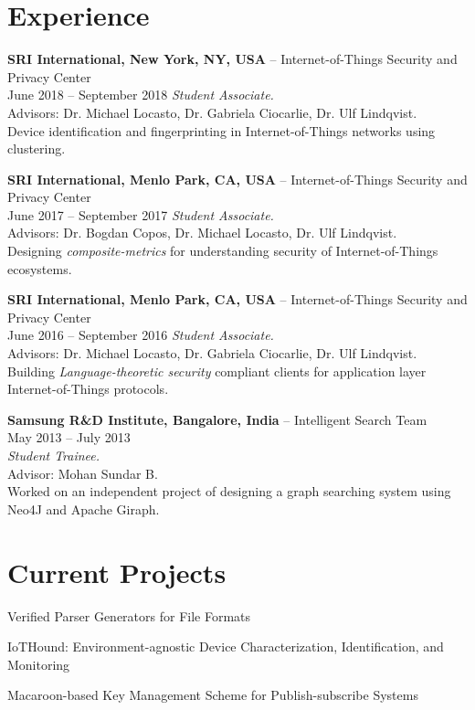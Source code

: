 \documentclass[letterpaper,10pt]{article}
\renewenvironment{itemize}{
  \begin{list}{}{
    \setlength{\leftmargin}{1.5em}
  }
}{
  \end{list}
}
\begin{document}
\section*{Experience}
\begin{itemize}
\setlength\itemsep{0ex}
\item \textbf{SRI International, New York, NY, USA} -- Internet-of-Things Security and Privacy Center\\
    June 2018 -- September 2018
    \textit{Student Associate.} \\ Advisors: Dr. Michael Locasto, Dr. Gabriela Ciocarlie, Dr. Ulf Lindqvist.\\
		Device identification and fingerprinting in Internet-of-Things networks using clustering.
\item \textbf{SRI International, Menlo Park, CA, USA} -- Internet-of-Things Security and Privacy Center\\
    June 2017 -- September 2017
    \textit{Student Associate.} \\ Advisors: Dr. Bogdan Copos, Dr. Michael Locasto, Dr. Ulf Lindqvist.\\
    Designing \textit{composite-metrics} for understanding security of Internet-of-Things ecosystems.
\item \textbf{SRI International, Menlo Park, CA, USA} -- Internet-of-Things Security and Privacy Center\\
    June 2016 -- September 2016
    \textit{Student Associate.} \\ Advisors: Dr. Michael Locasto, Dr. Gabriela Ciocarlie, Dr. Ulf Lindqvist.\\
    Building \textit{Language-theoretic security} compliant clients for application layer Internet-of-Things protocols.
\item \textbf{Samsung R\&D Institute, Bangalore, India} -- Intelligent Search Team\\
    May 2013 -- July 2013\\
    \textit{Student Trainee.} \\ Advisor: Mohan Sundar B.\\
    Worked on an independent project of designing a graph searching system using Neo4J and Apache Giraph.
\end{itemize}

\section*{Current Projects}
\begin{itemize}
\setlength\itemsep{0ex}
\item Verified Parser Generators for File Formats
\item IoTHound: Environment-agnostic Device Characterization, Identification, and Monitoring
\item Macaroon-based Key Management Scheme for Publish-subscribe Systems
\end{itemize}
\end{document}
